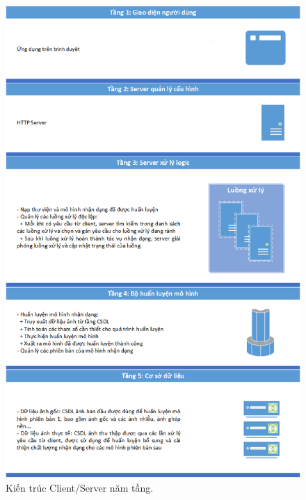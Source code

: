 \begin{figure}[H]
	\centering
	\includegraphics[width=1\linewidth]{images/client_server_ntang}
	\caption{Kiến trúc Client/Server năm tầng.}
	\label{fig:client_server_ntang}
\end{figure}

